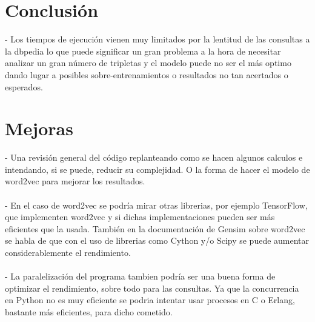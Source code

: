 \documentclass[12pt,a4paper]{article}
\begin{document}
\section{Conclusión}
- Los tiempos de ejecución vienen muy limitados por la lentitud de las consultas a la dbpedia lo que puede significar un gran problema a la hora de necesitar analizar un gran número de tripletas y el modelo puede no ser el más optimo dando lugar a posibles sobre-entrenamientos o resultados no tan acertados o esperados.

\section{Mejoras}
- Una revisión general del código replanteando como se hacen algunos calculos e intendando, si se puede, reducir su complejidad. O la forma de hacer el modelo de word2vec para mejorar los resultados.\\\\
- En el caso de word2vec se podría mirar otras librerias, por ejemplo TensorFlow, que implementen word2vec y si dichas implementaciones pueden ser más eficientes que la usada. También en la documentación de Gensim sobre word2vec se habla de que con el uso de librerias como Cython y/o Scipy se puede aumentar considerablemente el rendimiento.\\\\
- La paralelización del programa tambien podría ser una buena forma de optimizar el rendimiento, sobre todo para las consultas. Ya que la concurrencia en Python no es muy eficiente se podria intentar usar procesos en C o Erlang, bastante más eficientes, para dicho cometido.
\end{document}
